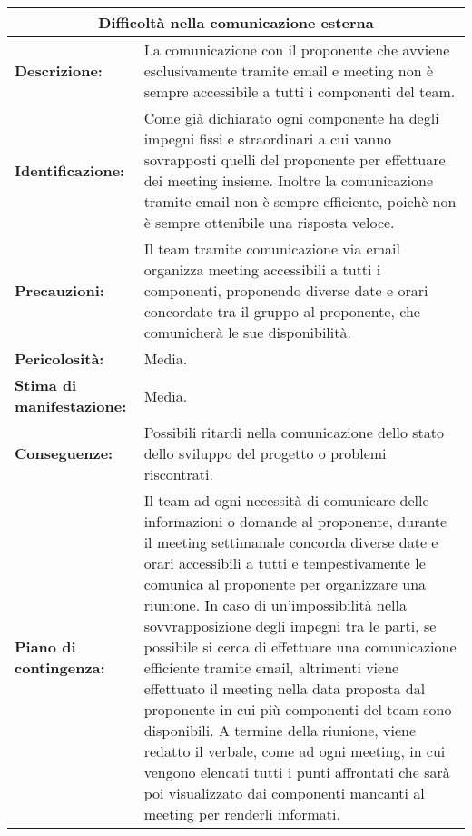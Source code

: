 \begin{tabular}{ |p{4cm}|p{10cm}|}
\hline
\multicolumn{2}{|c|}{\textbf{Difficoltà nella comunicazione esterna}} \\
\hline
\textbf{Descrizione:}& La comunicazione con il proponente che avviene esclusivamente tramite email e meeting non è sempre accessibile a tutti i componenti del team.\\
\hline
\textbf{Identificazione:}& Come già dichiarato ogni componente ha degli impegni fissi e straordinari a cui vanno sovrapposti quelli del proponente per effettuare dei meeting insieme. Inoltre la comunicazione tramite email non è sempre efficiente, poichè non è sempre ottenibile una risposta veloce.\\
\hline
\textbf{Precauzioni:}& Il team tramite comunicazione via email organizza meeting accessibili a tutti i componenti, proponendo diverse date e orari concordate tra il gruppo al proponente, che comunicherà le sue disponibilità.\\
\hline
\textbf{Pericolosità:}& Media.\\
\hline
\textbf{Stima di manifestazione:}& Media.\\
\hline
\textbf{Conseguenze:}& Possibili ritardi nella comunicazione dello stato dello sviluppo del progetto o problemi riscontrati.\\
\hline
\textbf{Piano di contingenza:}& Il team ad ogni necessità di comunicare delle informazioni o domande al proponente, durante il meeting settimanale concorda diverse date e orari accessibili a tutti e tempestivamente le comunica al proponente per organizzare una riunione. In caso di un'impossibilità nella sovvrapposizione degli impegni tra le parti, se possibile si cerca di effettuare una comunicazione efficiente tramite email, altrimenti viene effettuato il meeting nella data proposta dal proponente in cui più componenti del team sono disponibili. A termine della riunione, viene redatto il verbale, come ad ogni meeting, in cui vengono elencati tutti i punti affrontati che sarà poi visualizzato dai componenti mancanti al meeting per renderli informati.\\
\hline
\end{tabular}

\vspace{20pt}

